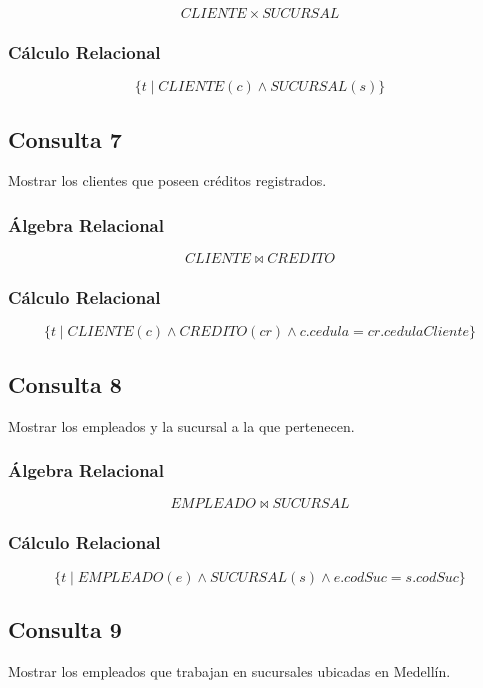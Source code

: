 \documentclass[stu,12pt,floatsintext]{apa7}
\begin{document}
\[
CLIENTE \times SUCURSAL
\]

\subsubsection{Cálculo Relacional}

\[
\{t \mid CLIENTE(c)
\land
SUCURSAL(s)\}
\]


\subsection{Consulta 7}
Mostrar los clientes que poseen créditos registrados.

\subsubsection{Álgebra Relacional}

\[
CLIENTE \bowtie CREDITO
\]

\subsubsection{Cálculo Relacional}

\[
\{t \mid
CLIENTE(c)
\land
CREDITO(cr)
\land
c.cedula=cr.cedulaCliente
\}
\]


\subsection{Consulta 8}
Mostrar los empleados y la sucursal a la que pertenecen.

\subsubsection{Álgebra Relacional}

\[
EMPLEADO \bowtie SUCURSAL
\]

\subsubsection{Cálculo Relacional}

\[
\{t \mid
EMPLEADO(e)
\land
SUCURSAL(s)
\land
e.codSuc=s.codSuc
\}
\]


\subsection{Consulta 9}
Mostrar los empleados que trabajan en sucursales ubicadas en Medellín.
\end{document}
